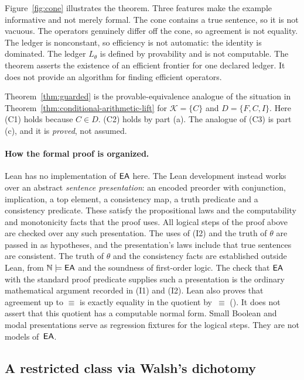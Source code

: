 Figure~\ref{fig:cone} illustrates the theorem. Three features make the example informative and not merely formal. The cone contains a true sentence, so it is not vacuous. The operators genuinely differ off the cone, so agreement is not equality. The ledger is nonconstant, so efficiency is not automatic: the identity is dominated. The ledger $L_\theta$ is defined by provability and is not computable. The theorem asserts the existence of an efficient frontier for one declared ledger. It does not provide an algorithm for finding efficient operators.

Theorem~\ref{thm:guarded} is the provable-equivalence analogue of the situation in Theorem~\ref{thm:conditional-arithmetic-lift} for $\mathcal{K}=\{C\}$ and $D=\{F,C,I\}$. Here (C1) holds because $C\in D$. (C2) holds by part (a). The analogue of (C3) is part (c), and it is \emph{proved}, not assumed.

\paragraph{How the formal proof is organized.}
Lean has no implementation of $\mathsf{EA}$ here. The Lean development instead works over an abstract \emph{sentence presentation}: an encoded preorder with conjunction, implication, a top element, a consistency map, a truth predicate and a consistency predicate. These satisfy the propositional laws and the computability and monotonicity facts that the proof uses. All logical steps of the proof above are checked over any such presentation. The uses of (I2) and the truth of $\theta$ are passed in as hypotheses, and the presentation's laws include that true sentences are consistent. The truth of $\theta$ and the consistency facts are established outside Lean, from $\mathbb{N}\models\mathsf{EA}$ and the soundness of first-order logic. The check that $\mathsf{EA}$ with the standard proof predicate supplies such a presentation is the ordinary mathematical argument recorded in (I1) and (I2). Lean also proves that agreement up to $\equiv$ is exactly equality in the quotient by~$\equiv$ (). It does not assert that this quotient has a computable normal form. Small Boolean and modal presentations serve as regression fixtures for the logical steps. They are not models of~$\mathsf{EA}$.

\subsection{A restricted class via Walsh's dichotomy}

